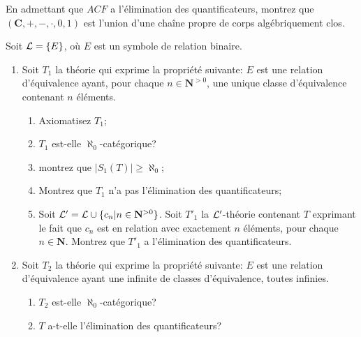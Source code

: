 \documentclass[12pt,a4paper]{exprog}
\newcommand{\IN}{\mathbf{N}}
\begin{document}
\begin{question}
  En admettant que $ACF$ a l'élimination des quantificateurs, montrez que
  $(\mathbf{C},+,-,\cdot,0,1)$ est l'union d'une chaîne propre de corps
  algébriquement clos.
\end{question}

\begin{question}
  Soit $\mathcal{L}=\{E\}$, où $E$ est un symbole de relation binaire.
  \begin{enumerate}
  \item Soit $T_{1}$ la théorie qui exprime la propriété suivante: $E$ est une
    relation d'équivalence ayant, pour chaque $n\in\mathbf{N}^{>0}$, une unique
    classe d'équivalence contenant $n$ éléments.
    \begin{enumerate}
    \item Axiomatisez $T_{1}$;
    \item $T_{1}$ est-elle $\aleph_{0}$-catégorique?
    \item montrez que $|S_{1}(T)|\ge\aleph_{0}$;
    \item Montrez que $T_{1}$ n'a pas l'élimination des quantificateurs;
    \item Soit $\Ll'=\Ll\cup\{c_{n}|n\in\IN^{>0}\}$. Soit $T'_{1}$ la
      $\mathcal{L}'$-théorie contenant $T$ exprimant le fait que $c_{n}$ est en relation
      avec exactement $n$ éléments, pour chaque $n\in\mathbf{N}$. Montrez que
      $T'_{1}$ a l'élimination des quantificateurs.
    \end{enumerate}
  \item Soit $T_{2}$ la théorie qui exprime la propriété suivante: $E$ est une
    relation d'équivalence ayant une infinite de classes d'équivalence, toutes
    infinies.
    \begin{enumerate}
    \item $T_{2}$ est-elle $\aleph_{0}$-catégorique?
    \item $T$ a-t-elle l'élimination des quantificateurs?
    \end{enumerate}
  \end{enumerate}
\end{question}
\end{document}
